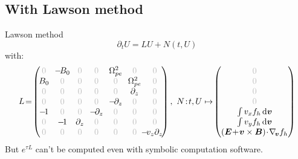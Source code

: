\documentclass{beamer}
\newcommand{\Mvb}[1]{\boldsymbol{#1}}
\begin{document}

\newcommand{\gz}{\textcolor{gris!50}{0}}

\subsection{With Lawson method}
\begin{frame}{Lawson method}
  $$\partial_tU = LU + N(t,U)$$
  with:
  $$
    L \!=\!\begin{pmatrix}
      \gz      & \!-\!B_0\! & \gz            &  \gz              &  \!\Omega_{pe}^2\! & \gz               & \gz \\ 
      \!B_0\!  &  \gz       & \gz            &  \gz              &  \gz               & \!\Omega_{pe}^2\! & \gz \\
      \gz      &  \gz       & \gz            &  \gz              &  \gz               & \partial_z        & \gz \\ 
      \gz      &  \gz       & \gz            &  \gz              & \!-\!\partial_z\!  & \gz               & \gz \\ 
      \!-\!1\! &  \gz       & \gz            & \!-\!\partial_z\! &  \gz               & \gz               & \gz \\ 
      \gz      & \!-\!1\!   & \!\partial_z\! &  \gz              &  \gz               & \gz               & \gz \\ 
      \gz      &  \gz       & \gz            &  \gz              &  \gz               & \gz               & \!\!\!\!\!-\!v_z\partial_z\! \\ 
    \end{pmatrix}
    ,\ 
    N\!:\!t,U\mapsto\!\begin{pmatrix}
      \gz \\
      \gz \\
      \gz \\
      \gz \\
      \int v_xf_h\dd{\Mvb{v}} \\
      \int v_yf_h\dd{\Mvb{v}} \\
      (\Mvb{E}\!+\!\Mvb{v}\times\Mvb{B})\!\cdot\!\nabla_{\!\Mvb{v}}f_h
    \end{pmatrix}
  $$
  But $e^{\tau L}$ can't be computed even with symbolic computation software.
\end{frame}
\end{document}
